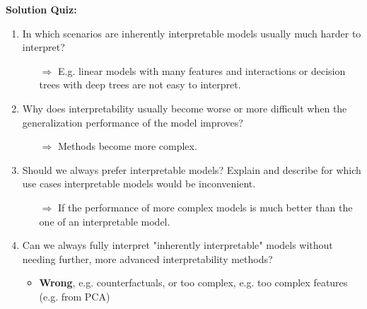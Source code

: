 \textbf{Solution Quiz:}\\\noindent
\medskip

   	
	\begin{enumerate}
   	    \item In which scenarios are inherently interpretable models usually much harder to interpret?
    	\begin{itemize}
    		\item[$\Rightarrow$] E.g. linear models with many features and interactions or decision trees with deep trees are not easy to interpret.
    	\end{itemize}
    	\item Why does interpretability usually become worse or more difficult when the generalization performance of the model improves?
    	\begin{itemize}
    		\item[$\Rightarrow$] Methods become more complex.
    	\end{itemize}
    	\item Should we always prefer interpretable models? Explain and describe for which use cases interpretable models would be inconvenient.
    	\begin{itemize}
    		\item[$\Rightarrow$] If the performance of more complex models is much better than the one of an interpretable model.
    	\end{itemize}
        \item Can we always fully interpret "inherently interpretable" models without needing further, more advanced interpretability methods?
        \begin{itemize}
            \item \textbf{Wrong}, e.g. counterfactuals, or too complex, e.g. too complex features (e.g. from PCA)


\end{itemize}
\end{enumerate}
